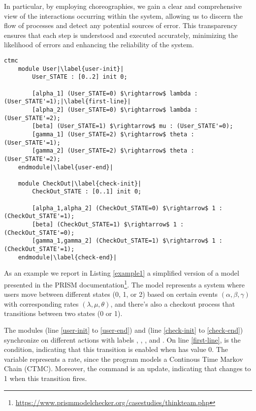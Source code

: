 In particular, by employing choreographies, we gain a clear and comprehensive view of the interactions occurring within the system, allowing us to discern the flow of processes and detect any potential sources of error. This transparency ensures that each step is understood and executed accurately, minimizing the likelihood of errors and enhancing the reliability of the system.

\begin{lstlisting}[style=prism-color,caption={A PRISM example},captionpos=b,label={example1},escapechar=|]
	ctmc 
	module User|\label{user-init}|
		User_STATE : [0..2] init 0;
	
		[alpha_1] (User_STATE=0) $\rightarrow$ lambda : (User_STATE'=1);|\label{first-line}|
		[alpha_2] (User_STATE=0) $\rightarrow$ lambda : (User_STATE'=2);
		[beta] (User_STATE=1) $\rightarrow$ mu : (User_STATE'=0);
		[gamma_1] (User_STATE=2) $\rightarrow$ theta : (User_STATE'=1);
		[gamma_2] (User_STATE=2) $\rightarrow$ theta : (User_STATE'=2);
	endmodule|\label{user-end}|
	
	module CheckOut|\label{check-init}|
		CheckOut_STATE : [0..1] init 0;
	
		[alpha_1,alpha_2] (CheckOut_STATE=0) $\rightarrow$ 1 : (CheckOut_STATE'=1);
		[beta] (CheckOut_STATE=1) $\rightarrow$ 1 : (CheckOut_STATE'=0);
		[gamma_1,gamma_2] (CheckOut_STATE=1) $\rightarrow$ 1 : (CheckOut_STATE'=1);
	endmodule|\label{check-end}|
	\end{lstlisting}

As an example we report in Listing \ref{example1} a simplified version of a model presented in the PRISM documentation\footnote{\url{https://www.prismmodelchecker.org/casestudies/thinkteam.php}}. The model represents a system where users move between different states (0, 1, or 2) based on certain events $(\alpha, \beta, \gamma)$ with corresponding rates $(\lambda, \mu, \theta)$, and there's also a checkout process that transitions between two states (0 or 1).

The modules  (line \ref{user-init} to \ref{user-end}) and  (line \ref{check-init} to \ref{check-end}) synchronize on different actions with labels , , ,  and . On line \ref{first-line},  is the condition, indicating that this transition is enabled when  has value 0. The variable  represents a rate, since the program models a Continous Time Markov Chain (CTMC). Moreover, the command  is an update, indicating that  changes to 1 when this transition fires.

